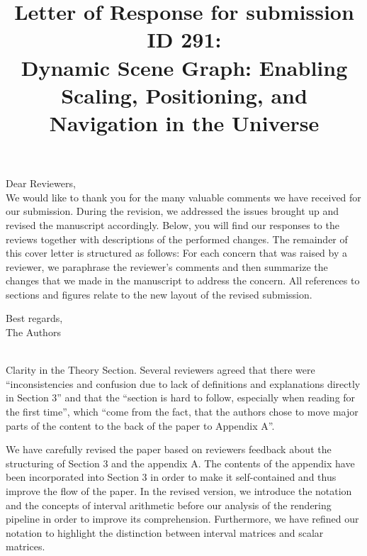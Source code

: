 \documentclass{article}
\date{}
\begin{document}
\title{Letter of Response for submission ID 291: \\Dynamic Scene Graph: Enabling Scaling, Positioning, and Navigation in the Universe}
\maketitle

Dear Reviewers, \\

We would like to thank you for the many valuable comments we have received for our submission.
During the revision, we addressed the issues brought up and revised the manuscript accordingly.
Below, you will find our responses to the reviews together with descriptions of the performed changes.
The remainder of this cover letter is structured as follows:
For each concern that was raised by a reviewer, we paraphrase the reviewer's comments and then summarize the changes that we made in the manuscript to address the concern.
All references to sections and figures relate to the new layout of the revised submission.


Best regards, \\
The Authors \\\\

\newpage

\begin{tcolorbox}
{\large Clarity in the Theory Section. }  Several reviewers agreed that there were ``inconsistencies and confusion due to lack of definitions and explanations directly in Section 3'' and that the ``section is hard to follow, especially when reading for the first time'', which ``come from the fact, that the authors chose to move major parts of the content to the back of the paper to Appendix A''.
\end{tcolorbox}
We have carefully revised the paper based on reviewers feedback about the structuring of Section 3 and the appendix A.
The contents of the appendix have been incorporated into Section 3 in order to make it self-contained and thus improve the flow of the paper.
In the revised version, we introduce the notation and the concepts of interval arithmetic before our analysis of the rendering pipeline in order to improve its comprehension.
Furthermore, we have refined our notation to highlight the distinction between interval matrices and scalar matrices.
\end{document}
